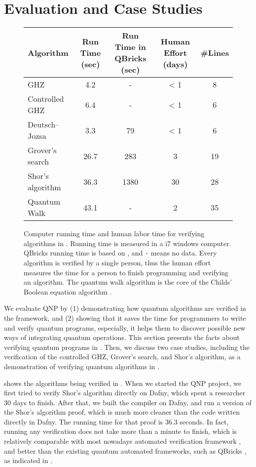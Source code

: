 \section{\qafny Evaluation and Case Studies}
\label{sec:arith-oqasm}

\begin{figure*}[t]
{\small
\begin{tabular}{|l|c|c|c|c|}
\hline
Algorithm & Run Time (sec) & Run Time in QBricks (sec) & Human Effort (days) & \#Lines \\
                     \hline
GHZ & 4.2 & - & < 1 & 8 \\
Controlled GHZ & 6.4 & - & < 1 & 6  \\
Deutsch–Jozsa & 3.3 & 79 & < 1 & 6 \\
Grover's search & 26.7 & 283 &  3 & 19 \\
Shor's algorithm & 36.3 & 1380 & 30 & 28  \\
Quantum Walk & 43.1 & - & 2 & 35 \\
\hline                           
\end{tabular}
}
\caption{Computer running time and human labor time for verifying algorithms in \qafny. Running time is measured in a i7 windows computer. 
QBricks running time is based on \cite{qbricks}, and \texttt{-} means no data.
Every algorithm is verified by a single person, thus the human effort measures the time for a person to finish programming and verifying an algorithm. The quantum walk algorithm is the core of the Childs' Boolean equation algorithm \cite{ChildsNAND}.}
\label{fig:circ-evaluation}
\end{figure*}

We evaluate QNP by (1) demonstrating how quantum algorithms are verified in the framework, and (2) showing that it saves the time for programmers to write and verify quantum programs, especially, it helps them to discover possible new ways of integrating quantum operations.
%
This section presents the facts about verifying quantum programs in \qafny. Then, we discuss two case studies, including the verification of the controlled GHZ, Grover's search, and Shor's algorithm, as a demonstration of verifying quantum algorithms in \qafny.

 shows the algorithms being verified in \qafny. When we started the QNP project, we first tried to verify Shor's algorithm directly on Dafny, which spent a researcher 30 days to finish. After that, we built the \qafny compiler on Dafny, and run a \qafny version of the Shor's algorithm proof, which is much more cleaner than the code written directly in Dafny. The running time for that proof is 36.3 seconds. In fact, running any \qafny verification does not take more than a minute to finish, which is relatively comparable with most nowadays automated verification framework \cite{DBLP:conf/pldi/Qiu0SM13,dafnyref}, and better than the existing quantum automated frameworks, such as QBricks \cite{qbricks}, as indicated in .

